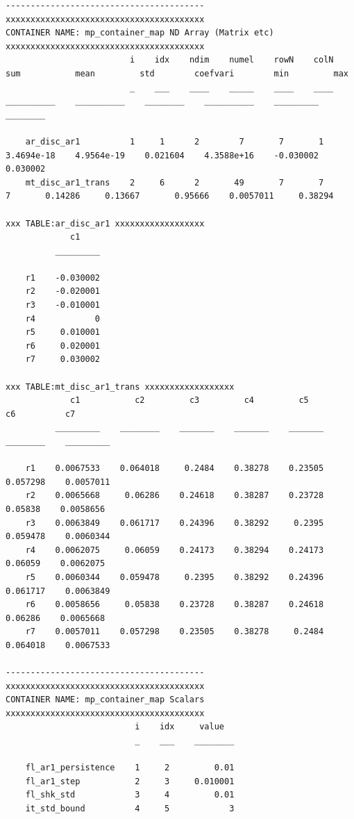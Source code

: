 \documentclass[
]{book}
\begin{document}
\begin{verbatim}
----------------------------------------
xxxxxxxxxxxxxxxxxxxxxxxxxxxxxxxxxxxxxxxx
CONTAINER NAME: mp_container_map ND Array (Matrix etc)
xxxxxxxxxxxxxxxxxxxxxxxxxxxxxxxxxxxxxxxx
                         i    idx    ndim    numel    rowN    colN       sum           mean         std        coefvari        min         max   
                         _    ___    ____    _____    ____    ____    __________    __________    ________    __________    _________    ________

    ar_disc_ar1          1     1      2        7       7       1      3.4694e-18    4.9564e-19    0.021604    4.3588e+16    -0.030002    0.030002
    mt_disc_ar1_trans    2     6      2       49       7       7               7       0.14286     0.13667       0.95666    0.0057011     0.38294

xxx TABLE:ar_disc_ar1 xxxxxxxxxxxxxxxxxx
             c1    
          _________

    r1    -0.030002
    r2    -0.020001
    r3    -0.010001
    r4            0
    r5     0.010001
    r6     0.020001
    r7     0.030002

xxx TABLE:mt_disc_ar1_trans xxxxxxxxxxxxxxxxxx
             c1           c2         c3         c4         c5          c6          c7    
          _________    ________    _______    _______    _______    ________    _________

    r1    0.0067533    0.064018     0.2484    0.38278    0.23505    0.057298    0.0057011
    r2    0.0065668     0.06286    0.24618    0.38287    0.23728     0.05838    0.0058656
    r3    0.0063849    0.061717    0.24396    0.38292     0.2395    0.059478    0.0060344
    r4    0.0062075     0.06059    0.24173    0.38294    0.24173     0.06059    0.0062075
    r5    0.0060344    0.059478     0.2395    0.38292    0.24396    0.061717    0.0063849
    r6    0.0058656     0.05838    0.23728    0.38287    0.24618     0.06286    0.0065668
    r7    0.0057011    0.057298    0.23505    0.38278     0.2484    0.064018    0.0067533

----------------------------------------
xxxxxxxxxxxxxxxxxxxxxxxxxxxxxxxxxxxxxxxx
CONTAINER NAME: mp_container_map Scalars
xxxxxxxxxxxxxxxxxxxxxxxxxxxxxxxxxxxxxxxx
                          i    idx     value  
                          _    ___    ________

    fl_ar1_persistence    1     2         0.01
    fl_ar1_step           2     3     0.010001
    fl_shk_std            3     4         0.01
    it_std_bound          4     5            3


\end{verbatim}
\end{document}
